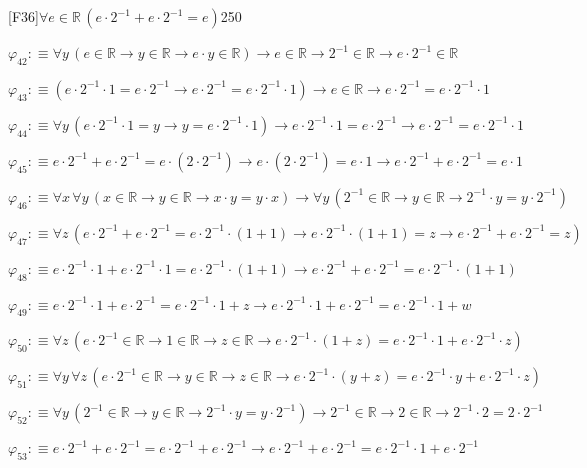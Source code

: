 \begin{fullproof}{[F36]}{$\forall e \in \mathbb{R}\,(e \cdot 2^{-1} + e \cdot 2^{-1} = e)$}{250}
\begin{abbrevlist}
\item $\varphi_{42} :\equiv \forall y\,(e \in \mathbb{R} \to y \in \mathbb{R} \to e \cdot y \in \mathbb{R}) \to e \in \mathbb{R} \to 2^{-1} \in \mathbb{R} \to e \cdot 2^{-1} \in \mathbb{R}$
\item $\varphi_{43} :\equiv (e \cdot 2^{-1} \cdot 1 = e \cdot 2^{-1} \to e \cdot 2^{-1} = e \cdot 2^{-1} \cdot 1) \to e \in \mathbb{R} \to e \cdot 2^{-1} = e \cdot 2^{-1} \cdot 1$
\item $\varphi_{44} :\equiv \forall y\,(e \cdot 2^{-1} \cdot 1 = y \to y = e \cdot 2^{-1} \cdot 1) \to e \cdot 2^{-1} \cdot 1 = e \cdot 2^{-1} \to e \cdot 2^{-1} = e \cdot 2^{-1} \cdot 1$
\item $\varphi_{45} :\equiv e \cdot 2^{-1} + e \cdot 2^{-1} = e \cdot (2 \cdot 2^{-1}) \to e \cdot (2 \cdot 2^{-1}) = e \cdot 1 \to e \cdot 2^{-1} + e \cdot 2^{-1} = e \cdot 1$
\item $\varphi_{46} :\equiv \forall x\,\forall y\,(x \in \mathbb{R} \to y \in \mathbb{R} \to x \cdot y = y \cdot x) \to \forall y\,(2^{-1} \in \mathbb{R} \to y \in \mathbb{R} \to 2^{-1} \cdot y = y \cdot 2^{-1})$
\item $\varphi_{47} :\equiv \forall z\,(e \cdot 2^{-1} + e \cdot 2^{-1} = e \cdot 2^{-1} \cdot (1 + 1) \to e \cdot 2^{-1} \cdot (1 + 1) = z \to e \cdot 2^{-1} + e \cdot 2^{-1} = z)$
\item $\varphi_{48} :\equiv e \cdot 2^{-1} \cdot 1 + e \cdot 2^{-1} \cdot 1 = e \cdot 2^{-1} \cdot (1 + 1) \to e \cdot 2^{-1} + e \cdot 2^{-1} = e \cdot 2^{-1} \cdot (1 + 1)$
\item $\varphi_{49} :\equiv e \cdot 2^{-1} \cdot 1 + e \cdot 2^{-1} = e \cdot 2^{-1} \cdot 1 + z \to e \cdot 2^{-1} \cdot 1 + e \cdot 2^{-1} = e \cdot 2^{-1} \cdot 1 + w$
\item $\varphi_{50} :\equiv \forall z\,(e \cdot 2^{-1} \in \mathbb{R} \to 1 \in \mathbb{R} \to z \in \mathbb{R} \to e \cdot 2^{-1} \cdot (1 + z) = e \cdot 2^{-1} \cdot 1 + e \cdot 2^{-1} \cdot z)$
\item $\varphi_{51} :\equiv \forall y\,\forall z\,(e \cdot 2^{-1} \in \mathbb{R} \to y \in \mathbb{R} \to z \in \mathbb{R} \to e \cdot 2^{-1} \cdot (y + z) = e \cdot 2^{-1} \cdot y + e \cdot 2^{-1} \cdot z)$
\item $\varphi_{52} :\equiv \forall y\,(2^{-1} \in \mathbb{R} \to y \in \mathbb{R} \to 2^{-1} \cdot y = y \cdot 2^{-1}) \to 2^{-1} \in \mathbb{R} \to 2 \in \mathbb{R} \to 2^{-1} \cdot 2 = 2 \cdot 2^{-1}$
\item $\varphi_{53} :\equiv e \cdot 2^{-1} + e \cdot 2^{-1} = e \cdot 2^{-1} + e \cdot 2^{-1} \to e \cdot 2^{-1} + e \cdot 2^{-1} = e \cdot 2^{-1} \cdot 1 + e \cdot 2^{-1}$

\end{abbrevlist}
\end{fullproof}
